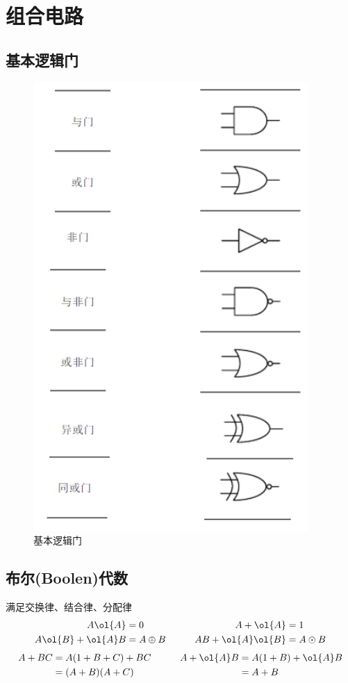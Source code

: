 \section{组合电路}
\subsection{基本逻辑门}
\begin{figure}[htbp]
	\centering
	\includegraphics[width=0.6\linewidth]{fig/logic_gates.PNG}
	\caption{基本逻辑门}
\end{figure}
\subsection{布尔(Boolen)代数}
满足交换律、结合律、分配律
\[\begin{aligned}
A\ol{A}&=0 \qquad &A+\ol{A}&=1\\
A\ol{B}+\ol{A}B&=A\oplus B \qquad &AB+\ol{A}\ol{B}&=A\odot B
\end{aligned}\]
\[\begin{aligned}
A+BC&=A(1+B+C)+BC \qquad &A+\ol{A}B&=A(1+B)+\ol{A}B\\
&=(A+B)(A+C)\qquad & &=A+B
\end{aligned}\]

